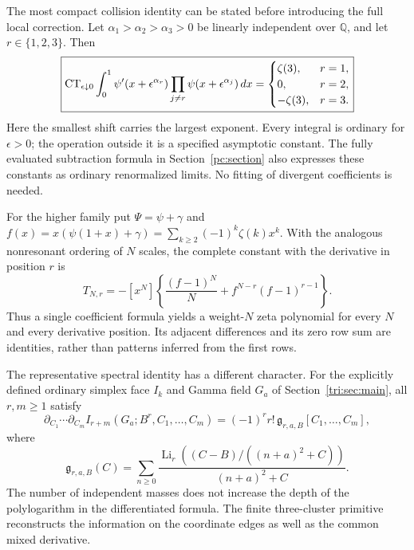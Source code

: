 The most compact collision identity can be stated before introducing
the full local correction. Let $\alpha_1>\alpha_2>\alpha_3>0$ be
linearly independent over $\mathbb Q$, and let $r\in\{1,2,3\}$.
Then
\begin{equation}\label{intro:triple}
\boxed{\displaystyle
\operatorname{CT}_{\epsilon\downarrow0}\int_0^1
 \psi'(x+\epsilon^{\alpha_r})
 \prod_{j\ne r}\psi(x+\epsilon^{\alpha_j})\,dx
 =\begin{cases}
  \zeta(3),&r=1,\\
  0,&r=2,\\
  -\zeta(3),&r=3.
 \end{cases}}
\end{equation}
Here the smallest shift carries the largest exponent. Every integral
is ordinary for $\epsilon>0$; the operation outside it is a specified
asymptotic constant. The fully evaluated subtraction formula in
Section~\ref{pc:section} also expresses these constants as ordinary
renormalized limits. No fitting of divergent coefficients is needed.

For the higher family put $\Psi=\psi+\gamma$ and
$f(x)=x(\psi(1+x)+\gamma)=\sum_{k\ge2}(-1)^k\zeta(k)x^k$.
With the analogous nonresonant ordering of $N$ scales, the complete
constant with the derivative in position $r$ is
\begin{equation}\label{intro:allN}
\boxed{\displaystyle
T_{N,r}=-[x^N]\left\{\frac{(f-1)^N}{N}
                     +f^{N-r}(f-1)^{r-1}\right\}.}
\end{equation}
Thus a single coefficient formula yields a weight-$N$ zeta polynomial
for every $N$ and every derivative position. Its adjacent differences
and its zero row sum are identities, rather than patterns inferred from
the first rows.

The representative spectral identity has a different character. For
the explicitly defined ordinary simplex face $I_k$ and Gamma field $G_a$
of Section~\ref{tri:sec:main}, all $r,m\ge1$ satisfy
\begin{equation}\label{intro:mixed}
\partial_{C_1}\cdots\partial_{C_m}
 I_{r+m}(G_a;B^r,C_1,\ldots,C_m)
 =(-1)^r r!\,\mathfrak g_{r,a,B}[C_1,\ldots,C_m],
\end{equation}
where
\[
\mathfrak g_{r,a,B}(C)=\sum_{n\ge0}
 \frac{\operatorname{Li}_r((C-B)/((n+a)^2+C))}{(n+a)^2+C}.
\]
The number of independent masses does not increase the depth of the
polylogarithm in the differentiated formula. The finite three-cluster
primitive reconstructs the information on the coordinate edges as well
as the common mixed derivative.

